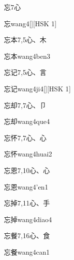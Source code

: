 \begin{entry}{忘}{7}{⼼}
  \begin{phonetics}{忘}{wang4}[][HSK 1]
  \end{phonetics}
\end{entry}

\begin{entry}{忘本}{7,5}{⼼、⽊}
  \begin{phonetics}{忘本}{wang4ben3}
  \end{phonetics}
\end{entry}

\begin{entry}{忘记}{7,5}{⼼、⾔}
  \begin{phonetics}{忘记}{wang4ji4}[][HSK 1]
  \end{phonetics}
\end{entry}

\begin{entry}{忘却}{7,7}{⼼、⼙}
  \begin{phonetics}{忘却}{wang4que4}
  \end{phonetics}
\end{entry}

\begin{entry}{忘怀}{7,7}{⼼、⼼}
  \begin{phonetics}{忘怀}{wang4huai2}
  \end{phonetics}
\end{entry}

\begin{entry}{忘恩}{7,10}{⼼、⼼}
  \begin{phonetics}{忘恩}{wang4'en1}
  \end{phonetics}
\end{entry}

\begin{entry}{忘掉}{7,11}{⼼、⼿}
  \begin{phonetics}{忘掉}{wang4diao4}
  \end{phonetics}
\end{entry}

\begin{entry}{忘餐}{7,16}{⼼、⾷}
  \begin{phonetics}{忘餐}{wang4can1}
  \end{phonetics}
\end{entry}

